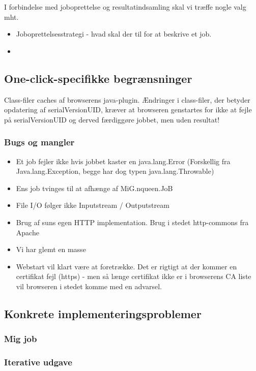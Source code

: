 \documentclass[final,a4paper,10pt]{article}
\begin{document}
I forbindelse med joboprettelse og resultatindsamling skal vi træffe nogle valg mht.
\begin{itemize}
\item{Joboprettelsesstrategi - hvad skal der til for at beskrive et job.}
\item{}
\end{itemize}

\subsection{One-click-specifikke begrænsninger}

Class-filer caches af browserens java-plugin. Ændringer i class-filer, der betyder opdatering af serialVersionUID, kræver at browseren genstartes for ikke at fejle på serialVersionUID og derved færdiggøre jobbet, men uden resultat! 

\subsubsection{Bugs og mangler}
\begin{itemize}
	\item Et job fejler ikke hvis jobbet kaster en java.lang.Error (Forskellig fra Java.lang.Exception, begge har dog typen java.lang.Throwable)
	\item Ens job tvinges til at afhænge af MiG.nqueen.JoB
	\item File I/O følger ikke Inputstream / Outputstream	
	\item Brug af suns egen HTTP implementation. Brug i stedet http-commons fra Apache
	\item Vi har glemt en masse
	\item Webstart vil klart være at foretrække. Det er rigtigt at der kommer en certifikat fejl (https) - men så længe certifikat ikke er i browserens CA liste vil browseren i stedet komme med en advarsel.
\end{itemize}


\subsection{Konkrete implementeringsproblemer}
\subsubsection{Mig job}\label{label}
\subsubsection{Iterative udgave}
\end{document}

